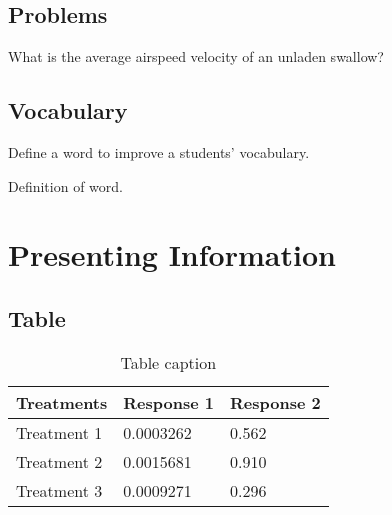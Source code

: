 \documentclass[11pt,fleqn]{book} %
\begin{document}

\section{Problems}

\begin{problem}
What is the average airspeed velocity of an unladen swallow?
\end{problem}


\section{Vocabulary}

Define a word to improve a students' vocabulary.

\begin{vocabulary}[Word]
Definition of word.
\end{vocabulary}



\chapter{Presenting Information}

\section{Table}

\begin{table}[h]
\centering
\begin{tabular}{l l l}
\toprule
\textbf{Treatments} & \textbf{Response 1} & \textbf{Response 2}\\
\midrule
Treatment 1 & 0.0003262 & 0.562 \\
Treatment 2 & 0.0015681 & 0.910 \\
Treatment 3 & 0.0009271 & 0.296 \\
\bottomrule
\end{tabular}
\caption{Table caption}
\end{table}
\end{document}
